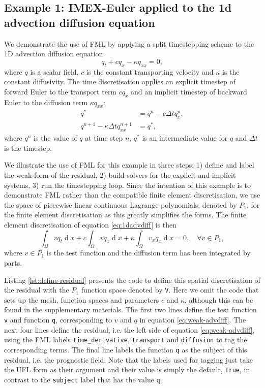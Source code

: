 \documentclass[journal abbreviation, manuscript]{copernicus}
\DeclareMathOperator{\diff}{d}
\begin{document}
\subsection{Example 1: IMEX-Euler applied to the 1d advection diffusion equation}

We demonstrate the use of FML by applying a split timestepping scheme
to the 1D advection diffusion equation
\begin{equation}\label{eq:1dadvdiff}
  q_t + cq_x - \kappa q_{xx} = 0,
\end{equation}
where $q$ is a scalar field, $c$ is the constant transporting velocity
and $\kappa$ is the constant diffusivity. The time discretisation
applies an explicit timestep of forward Euler to the transport term
$cq_x$ and an implicit timestep of backward Euler to the diffusion
term $\kappa q_{xx}$:
\begin{align}
  q^* &= q^n - c \Delta t q_x^n, \label{eq:explicit-advdiff} \\
  q^{n+1} - \kappa \Delta t q_{xx}^{n+1} &= q^*, \label{eq:implicit-advdiff}
\end{align}
where $q^n$ is the value of $q$ at time step $n$, $q^*$ is an
intermediate value for $q$ and $\Delta t$ is the timestep.

We illustrate the use of FML for this example in three steps: 1)
define and label the weak form of the residual, 2) build solvers for
the explicit and implicit systems, 3) run the timestepping loop. Since
the intention of this example is to demonstrate FML rather than the
compatible finite element discretisation, we use the space of piecewise
linear continuous Lagrange polynomials, denoted by $P_1$, for the
finite element discretisation as this greatly simplifies the
forms. The finite element discretisation of equation
\ref{eq:1dadvdiff} is then
\begin{equation}\label{eq:weak-advdiff}
  \int_\Omega vq_t \diff x + c \int_\Omega v q_x \diff x + \kappa \int_\Omega v_x q_x \diff x = 0, \quad \forall v \in P_1,
\end{equation}
where $v\in P_1$ is the test function and the diffusion term has been
integrated by parts.

Listing \ref{lst:define-residual} presents the code to define this
spatial discretisation of the residual with the $P_1$ function space
denoted by \texttt{V}. Here we omit the code that sets up the mesh,
function spaces and parameters $c$ and $\kappa$, although this can be
found in the supplementary materials. The first two lines define the
test function \texttt{v} and function \texttt{q}, corresponding to $v$
and $q$ in equation \ref{eq:weak-advdiff}. The next four lines define
the residual, i.e. the left side of equation \ref{eq:weak-advdiff},
using the FML labels \texttt{time\_derivative}, \texttt{transport} and
\texttt{diffusion} to tag the corresponding terms. The final line
labels the function \texttt{q} as the subject of this residual,
i.e. the prognostic field. Note that the labels used for tagging just
take the UFL form as their argument and their value is simply the
default, \texttt{True}, in contrast to the \texttt{subject} label that
has the value \texttt{q}.
\end{document}

